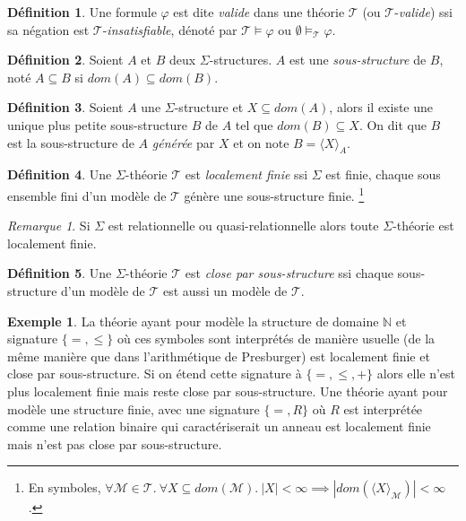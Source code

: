 \documentclass[a4paper, twoside]{scrartcl}
\theoremstyle{plain}%
\theoremstyle{definition}
\newtheorem{defn}{Définition}[section]
\newtheorem{exmp}{Exemple}[section]
\theoremstyle{remark}
\newtheorem*{rem}{Remarque}
\begin{document}
\begin{defn}
  Une formule $\varphi$ est dite \emph{valide} dans une théorie
  $\mathcal{T}$ (ou $\mathcal{T}$-\emph{valide}) ssi sa négation est
  $\mathcal{T}$-\emph{insatisfiable}, dénoté par $\mathcal{T} \vDash
  \varphi$ ou $\emptyset \vDash_{\mathcal{T}} \varphi$.
\end{defn}


\begin{defn}
  Soient $A$ et $B$ deux $\Sigma$-structures. $A$ est une
  \emph{sous-structure} de $B$, noté $A \subseteq B$ si $dom(A)
  \subseteq dom(B)$.
\end{defn}

\begin{defn}
  Soient $A$ une $\Sigma$-structure et $X \subseteq dom(A)$, alors il
  existe une unique plus petite sous-structure $B$ de $A$ tel que
  $dom(B) \subseteq X$. On dit que $B$ est la sous-structure de $A$
  \emph{générée} par $X$ et on note $B = \langle X \rangle_A$.
\end{defn}


\begin{defn}
  Une $\Sigma$-théorie $\mathcal{T}$ est \emph{localement finie} ssi $\Sigma$ est
  finie, chaque sous ensemble fini d'un modèle de $\mathcal{T}$ génère une
  sous-structure finie.
  \footnote{En symboles, $\forall \mathcal{M} \in \mathcal{T}.~ \forall X
  \subseteq dom(\mathcal{M}).~ |X| < \infty \implies
  |dom(\langle X \rangle_{\mathcal{M}})| < \infty$.}
\end{defn}

\begin{rem}
  Si $\Sigma$ est relationnelle ou quasi-relationnelle alors toute
  $\Sigma$-théorie est localement finie.
\end{rem}

\begin{defn}
  Une $\Sigma$-théorie $\mathcal{T}$ est \emph{close par
    sous-structure} ssi chaque sous-structure d'un modèle de
  $\mathcal{T}$ est aussi un modèle de $\mathcal{T}$.
\end{defn}

\begin{exmp}
  La théorie ayant pour modèle la structure de domaine $\mathbb{N}$ et
  signature $\{=, \leq\}$ où ces symboles sont interprétés de manière
  usuelle (de la même manière que dans l'arithmétique de Presburger)
  est localement finie et close par sous-structure. Si on étend cette
  signature à $\{=, \leq, +\}$ alors elle n'est plus localement finie
  mais reste close par sous-structure. Une théorie ayant pour modèle
  une structure finie, avec une signature $\{=, R\}$ où $R$ est
  interprétée comme une relation binaire qui caractériserait un anneau
  est localement finie mais n'est pas close par sous-structure.
\end{exmp}
\end{document}
